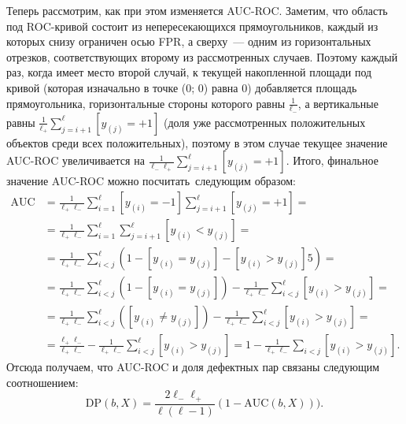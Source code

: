 \documentclass[12pt,a4paper]{article}
\begin{document}
\begin{esSolution}
	
	Теперь рассмотрим, как при этом изменяется AUC-ROC. Заметим, что область под ROC-кривой состоит из непересекающихся прямоугольников, каждый из которых снизу ограничен осью FPR, а сверху~--- одним из горизонтальных отрезков, соответствующих второму из рассмотренных случаев. Поэтому каждый раз, когда имеет место второй случай, к текущей накопленной площади под кривой (которая изначально в точке (0; 0) равна 0) добавляется площадь прямоугольника, горизонтальные стороны которого равны $\frac{1}{\ell_-}$, а вертикальные равны $\frac{1}{\ell_+} \sum_{j=i+1}^{\ell} [y_{(j)} = +1]$ (доля уже рассмотренных положительных объектов среди всех положительных), поэтому в этом случае текущее значение AUC-ROC увеличивается на $\frac{1}{\ell_- \ell_+} \sum_{j=i+1}^\ell [y_{(j)} = +1].$
	Итого, финальное значение AUC-ROC можно посчитать~следующим образом:
       \begin{align*}
      \text{AUC} &= \frac{1}{\ell_{+} \ell_{-}} \sum_{i = 1}^{\ell} [y_{(i)} = -1] \sum_{j = i + 1}^{\ell} [y_{(j)} = +1] =\\
       &= \frac{1}{\ell_{+} \ell_{-}}
        \sum_{i = 1}^{\ell} \sum_{j = i + 1}^{\ell} [y_{(i)} < y_{(j)}] =\\
        &= \frac{1}{\ell_{+} \ell_{-}} \sum_{i < j}^{\ell} (1 - [y_{(i)} = y_{(j)}] - [y_{(i)} > y_{(j)}]5) =\\
        &= \frac{1}{\ell_{+} \ell_{-}} \sum_{i < j}^{\ell} (1 - [y_{(i)} = y_{(j)}]) - \frac{1}{\ell_{+} \ell_{-}} \sum_{i < j}^{\ell} [y_{(i)} > y_{(j)}] =\\
        &= \frac{1}{\ell_{+} \ell_{-}} \sum_{i < j}^{\ell} ([y_{(i)} \ne y_{(j)}]) - \frac{1}{\ell_{+} \ell_{-}} \sum_{i < j}^{\ell} [y_{(i)} > y_{(j)}] =\\
        &=
        \frac{\ell_{+} \ell_{-}}{\ell_{+} \ell_{-}}
        - \frac{1}{\ell_{+} \ell_{-}}
        \sum_{i < j}^{\ell}
        [y_{(i)} > y_{(j)}]
        = 1
        -
        \frac{1}{\ell_{+} \ell_{-}}
        \sum_{i < j}
        [y_{(i)} > y_{(j)}].
\end{align*}
	Отсюда получаем, что AUC-ROC и доля дефектных пар связаны следующим соотношением:
	$$\text{DP}(b, X) = \frac{2 \ell_- \ell_+}{\ell (\ell -1)} (1 - \text{AUC} (b, X))).$$
	\vspace{0.5cm}
	\end{esSolution}
	
\end{document}
